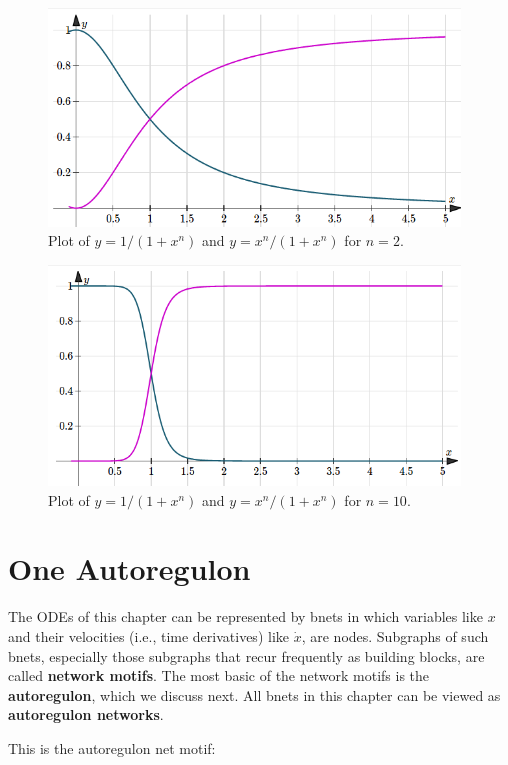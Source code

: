 \begin{figure}[h!]
\centering
\includegraphics[width=4.3in]
{autoregulons/hill-2.png}
\caption{Plot of $y= 1/(1+x^n)$
and $y=x^n/(1+x^n)$ for $n=2$.}
\label{fig-hill-n-2}
\end{figure}

\begin{figure}[h!]
\centering
\includegraphics[width=4.3in]
{autoregulons/hill-10.png}
\caption{Plot of $y= 1/(1+x^n)$
and $y=x^n/(1+x^n)$ for $n=10$.}
\label{fig-hill-n-10}
\end{figure}

\section{One Autoregulon}

The ODEs of this chapter can be represented by bnets
in which variables like $x$ and 
their velocities (i.e., time derivatives)
like $\dot{x}$,
are nodes.
Subgraphs of such bnets, especially those
subgraphs that recur frequently as building blocks, are called
{\bf network motifs}.  The most basic
of the network motifs is the {\bf autoregulon},
which we discuss next.  All bnets
in this chapter can be viewed as {\bf autoregulon
networks}.


This is the autoregulon net motif: 

